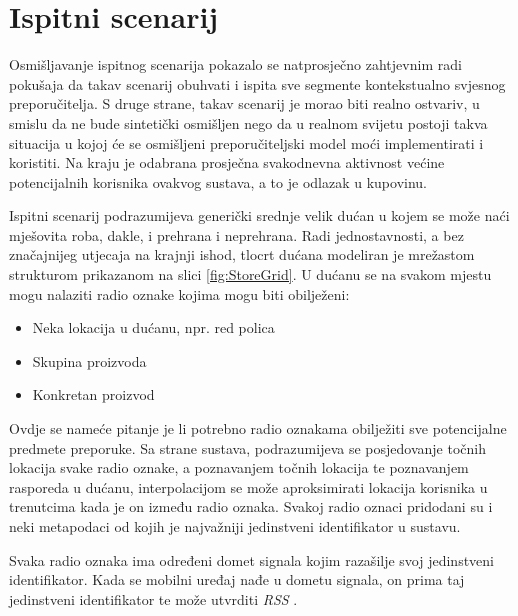 \documentclass[times, utf8, diplomski, numeric]{fer}
\begin{document}
\section{Ispitni scenarij}
Osmišljavanje ispitnog scenarija pokazalo se natprosječno zahtjevnim radi
pokušaja da takav scenarij obuhvati i ispita sve segmente kontekstualno svjesnog
preporučitelja. S druge strane, takav scenarij je morao biti realno
ostvariv, u smislu da ne bude sintetički osmišljen nego da u realnom
svijetu postoji takva situacija u kojoj će se osmišljeni preporučiteljski
model moći implementirati i koristiti. Na kraju je odabrana prosječna
svakodnevna aktivnost većine potencijalnih korisnika ovakvog sustava, a to je
odlazak u kupovinu.

Ispitni scenarij podrazumijeva generički srednje velik dućan u kojem se
može naći mješovita roba, dakle, i prehrana i neprehrana. Radi jednostavnosti, a
bez značajnijeg utjecaja na krajnji ishod, tlocrt dućana modeliran je mrežastom
strukturom prikazanom na slici \ref{fig:StoreGrid}. U dućanu se na svakom mjestu
mogu nalaziti radio oznake  kojima mogu biti obilježeni:
\begin{itemize}
  \item Neka lokacija u dućanu, npr. red polica
  \item Skupina proizvoda
  \item Konkretan proizvod
\end{itemize}
Ovdje se nameće pitanje je li potrebno radio oznakama obilježiti sve
potencijalne predmete preporuke. Sa strane sustava, podrazumijeva se
posjedovanje točnih lokacija svake radio oznake, a poznavanjem točnih lokacija
te poznavanjem rasporeda u dućanu, interpolacijom se može aproksimirati lokacija
korisnika u trenutcima kada je on između radio oznaka. Svakoj radio oznaci
pridodani su i neki metapodaci od kojih je najvažniji jedinstveni identifikator
u sustavu.

Svaka radio oznaka ima određeni domet signala kojim razašilje 
svoj jedinstveni identifikator. Kada se mobilni uređaj nađe u dometu signala, on
prima taj jedinstveni identifikator te može utvrditi \emph{RSS} . 
\end{document}
